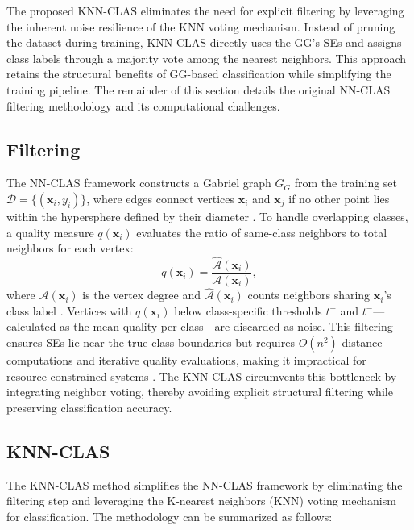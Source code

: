 \documentclass[conference]{IEEEtran}
\begin{document}
The proposed KNN-CLAS eliminates the need for explicit filtering by leveraging the inherent noise resilience of the KNN voting mechanism. Instead of pruning the dataset during training, KNN-CLAS directly uses the GG's SEs and assigns class labels through a majority vote among the nearest neighbors. This approach retains the structural benefits of GG-based classification while simplifying the training pipeline. The remainder of this section details the original NN-CLAS filtering methodology and its computational challenges.

\subsection{Filtering}

The NN-CLAS framework constructs a Gabriel graph \( G_G \) from the training set \( \mathcal{D} = \{(\mathbf{x}_i, y_i)\} \), where edges connect vertices \( \mathbf{x}_i \) and \( \mathbf{x}_j \) if no other point lies within the hypersphere defined by their diameter \cite{torres2016}. To handle overlapping classes, a quality measure \( q(\mathbf{x}_i) \) evaluates the ratio of same-class neighbors to total neighbors for each vertex:
\[
q(\mathbf{x}_i) = \frac{\hat{\mathcal{A}}(\mathbf{x}_i)}{\mathcal{A}(\mathbf{x}_i)},
\]
where \( \mathcal{A}(\mathbf{x}_i) \) is the vertex degree and \( \hat{\mathcal{A}}(\mathbf{x}_i) \) counts neighbors sharing \( \mathbf{x}_i \)'s class label \cite{souza2019}. Vertices with \( q(\mathbf{x}_i) \) below class-specific thresholds \( t^+ \) and \( t^- \)—calculated as the mean quality per class—are discarded as noise. This filtering ensures SEs lie near the true class boundaries but requires \( O(n^2) \) distance computations and iterative quality evaluations, making it impractical for resource-constrained systems \cite{arias2021}. The KNN-CLAS circumvents this bottleneck by integrating neighbor voting, thereby avoiding explicit structural filtering while preserving classification accuracy.

\subsection{KNN-CLAS}

The KNN-CLAS method simplifies the NN-CLAS framework by eliminating the filtering step and leveraging the K-nearest neighbors (KNN) voting mechanism for classification. The methodology can be summarized as follows:
\end{document}
